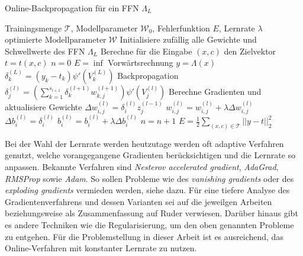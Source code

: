 \begin{algorithm}[h]
    \caption{Online-Backpropagation für ein FFN $\Lambda_L$}
    \label{alg:online_backprop}
    \begin{algorithmic}
    \Require  Trainingsmenge $\mathcal{T}$, Modellparameter $\mathcal{W}_0$, Fehlerfunktion $E$, Lernrate $\lambda$ 
    \Ensure $\text{optimierte Modellparameter} \; \mathcal{W}$
    \State Initialisiere zufällig alle Gewichte und Schwellwerte des FFN $\Lambda_L$ 
    \State Berechne für die Eingabe $(x,c)$ den Zielvektor $t=t(x,c)$
    \State $n=0$  
    \State $E=\inf$
     
        \State Vorwärtsrechnung $y=\Lambda(x)$
            \State $\delta_k^{(L)}=(y_k-t_k) \psi'(V^{(L)}_k)$
        \EndFor
        \State Backpropagation
                \State $\delta^{(l)}_j= \left(\sum_{k=1}^{s_{l+1}} \delta_k^{(l+1)} w^{(l+1)}_{k,j}\right) \psi'(V^{(l)}_j)$
             \EndFor
        \EndFor 
        \State Berechne Gradienten und aktualisiere Gewichte
        \State $\Delta w_{i,j}^{(l)}= \delta_i^{(l)} z^{(l-1)}_j$
        \State $w^{(l)}_{i,j}= w^{(l)}_{i,j} + \lambda \Delta w_{i,j}^{(l)}$
        \EndFor
        \State $\Delta b^{(l)}_i=\delta^{(l)}_i$
        \State $b^{(l)}_i=b^{(l)}_i + \lambda \Delta b^{(l)}_i$
        \EndFor
        \EndFor
        \State $n=n+1$
    \EndFor
    \State $E=\frac{1}{2} \sum_{(x,c) \in \mathcal{T}} ||y-t||_2^2$
    \EndWhile
    \end{algorithmic}
\end{algorithm}


Bei der Wahl der Lernrate werden heutzutage werden oft adaptive Verfahren genutzt, welche vorangegangene Gradienten berücksichtigen und die Lernrate so anpassen. Bekannte Verfahren sind \textit{Nesterov accelerated
gradient}\cite{sutskever2013importance}, \textit{AdaGrad}\cite{duchi2011adaptive}, \textit{RMSProp}\cite{tieleman2012lecture} sowie \textit{Adam}\cite{Kingma2015AdamAM}. So sollen Probleme wie des \textit{vanishing gradients} oder des \textit{exploding gradients} vermieden werden, siehe dazu\cite{hanin2018neural}.
Für eine tiefere Analyse des Gradientenverfahrens und dessen Varianten sei auf die jeweilgen Arbeiten beziehungsweise als Zusammenfassung auf Ruder\cite{ruder2016overview,} verwiesen. Darüber hinaus gibt es andere Techniken wie die Regularisierung, um den oben genannten Probleme zu entgehen.
Für die Problemstellung in dieser Arbeit ist es ausreichend, das Online-Verfahren mit konstanter Lernrate zu nutzen. 

